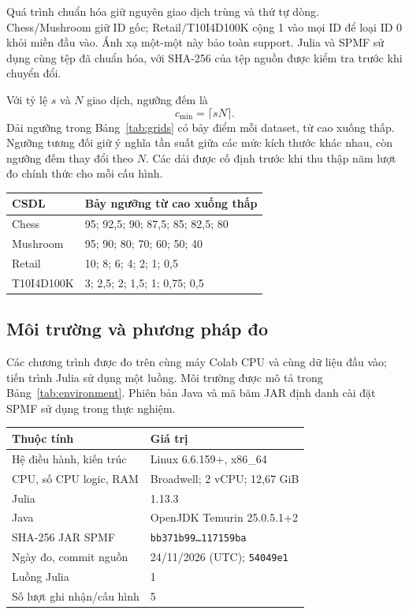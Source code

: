Quá trình chuẩn hóa giữ nguyên giao dịch trùng và thứ tự dòng.
Chess/Mushroom giữ ID gốc; Retail/T10I4D100K cộng 1 vào mọi ID để loại
ID 0 khỏi miền đầu vào. Ánh xạ một-một này bảo toàn support. Julia và
SPMF sử dụng cùng tệp đã chuẩn hóa, với SHA-256 của tệp nguồn được kiểm
tra trước khi chuyển đổi.

Với tỷ lệ $s$ và $N$ giao dịch, ngưỡng đếm là
\begin{equation}
c_{\min}=\lceil sN\rceil.
\label{eq:threshold}
\end{equation}
Dải ngưỡng trong Bảng~\ref{tab:grids} có bảy điểm mỗi dataset, từ cao
xuống thấp. Ngưỡng tương đối giữ ý nghĩa tần suất giữa các mức kích thước
khác nhau, còn ngưỡng đếm thay đổi theo $N$. Các dải được cố định trước
khi thu thập năm lượt đo chính thức cho mỗi cấu hình.

\begin{reporttable}
\caption{Dải minsup, đơn vị phần trăm; điểm thứ tư dùng cho Peak RSS.}
\label{tab:grids}
\footnotesize
\begin{tabular}{lp{}}\toprule
CSDL & Bảy ngưỡng từ cao xuống thấp\\\midrule
Chess & 95; 92,5; 90; 87,5; 85; 82,5; 80\\
Mushroom & 95; 90; 80; 70; 60; 50; 40\\
Retail & 10; 8; 6; 4; 2; 1; 0,5\\
T10I4D100K & 3; 2,5; 2; 1,5; 1; 0,75; 0,5\\\bottomrule
\end{tabular}
\end{reporttable}

\subsection{Môi trường và phương pháp đo}
Các chương trình được đo trên cùng máy Colab CPU và cùng dữ liệu đầu
vào; tiến trình Julia sử dụng một luồng. Môi trường được mô tả trong
Bảng~\ref{tab:environment}. Phiên bản Java và mã băm JAR định danh
cài đặt SPMF sử dụng trong thực nghiệm.

\begin{reporttable}
\caption{Môi trường benchmark Colab CPU; ngày đo theo UTC của runtime. Hash JAR viết gọn; bản đầy đủ lưu trong metadata.}
\label{tab:environment}
\small
\begin{tabular}{p{}p{}}\toprule
Thuộc tính & Giá trị\\\midrule
Hệ điều hành, kiến trúc & Linux 6.6.159+, x86\_64\\
CPU, số CPU logic, RAM & Broadwell; 2 vCPU; 12,67 GiB\\
Julia & 1.13.3\\
Java & OpenJDK Temurin 25.0.5.1+2\\
SHA-256 JAR SPMF & \texttt{bb371b99\ldots117159ba}\\
Ngày đo, commit nguồn & 24/11/2026 (UTC); \texttt{54049e1}\\
Luồng Julia & 1\\
Số lượt ghi nhận/cấu hình & 5\\\bottomrule
\end{tabular}
\end{reporttable}

